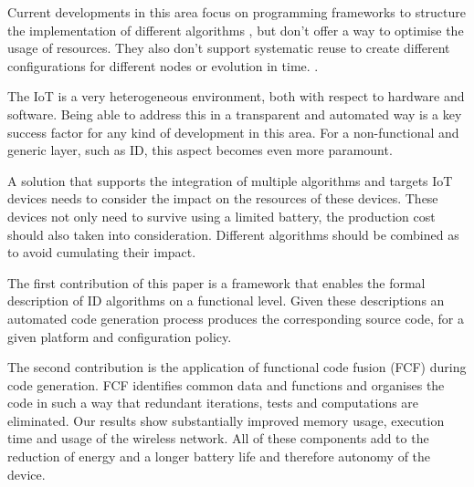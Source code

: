 \documentclass[conference]{IEEEtran}
\begin{document}

Current developments in this area focus on programming frameworks to structure
the implementation of different algorithms \cite{todo}, but don't offer a way
to optimise the usage of resources. They also don't support systematic reuse to
create different configurations for different nodes or evolution in time.
\cite{todo}.


The IoT is a very heterogeneous environment, both with respect to hardware and
software. Being able to address this in a transparent and automated way is a
key success factor for any kind of development in this area. For a
non-functional and generic layer, such as ID, this aspect becomes even more
paramount.

A solution that supports the integration of multiple algorithms and targets IoT
devices needs to consider the impact on the resources of these devices. These
devices not only need to survive using a limited battery, the production cost
should also taken into consideration. Different algorithms should be combined
as to avoid cumulating their impact.




The first contribution of this paper is a framework that enables the formal
description of ID algorithms on a functional level. Given these descriptions an
automated code generation process produces the corresponding source code, for a
given platform and configuration policy.

The second contribution is the application of functional code fusion (FCF)
during code generation. FCF identifies common data and functions and organises
the code in such a way that redundant iterations, tests and computations are
eliminated. Our results show substantially improved memory usage, execution
time and usage of the wireless network. All of these components add to the
reduction of energy and a longer battery life and therefore autonomy of the
device.
\end{document}
